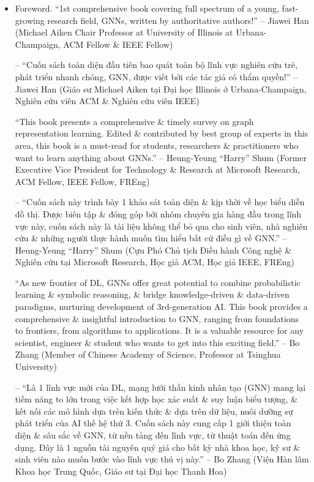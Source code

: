 \documentclass{article}
\begin{document}
\begin{itemize}
    \item {\sf Foreword.} ``1st comprehensive book covering full spectrum of a young, fast-growing research field, GNNs, written by authoritative authors!'' -- Jiawei Han (Michael Aiken Chair Professor at University of Illinois at Urbana-Champaign, ACM Fellow \& IEEE Fellow)

    -- ``Cuốn sách toàn diện đầu tiên bao quát toàn bộ lĩnh vực nghiên cứu trẻ, phát triển nhanh chóng, GNN, được viết bởi các tác giả có thẩm quyền!'' -- Jiawei Han (Giáo sư Michael Aiken tại Đại học Illinois ở Urbana-Champaign, Nghiên cứu viên ACM \& Nghiên cứu viên IEEE)

    ``This book presents a comprehensive \& timely survey on graph representation learning. Edited \& contributed by best group of experts in this area, this book is a must-read for students, researchers \& practitioners who want to learn anything about GNNs.'' -- Heung-Yeung ``Harry'' Shum (Former Executive Vice President for Technology \& Research at Microsoft Research, ACM Fellow, IEEE Fellow, FREng)

    -- ``Cuốn sách này trình bày 1 khảo sát toàn diện \& kịp thời về học biểu diễn đồ thị. Được biên tập \& đóng góp bởi nhóm chuyên gia hàng đầu trong lĩnh vực này, cuốn sách này là tài liệu không thể bỏ qua cho sinh viên, nhà nghiên cứu \& những người thực hành muốn tìm hiểu bất cứ điều gì về GNN.'' -- Heung-Yeung ``Harry'' Shum (Cựu Phó Chủ tịch Điều hành Công nghệ \& Nghiên cứu tại Microsoft Research, Học giả ACM, Học giả IEEE, FREng)

    ``As new frontier of DL, GNNs offer great potential to combine probabilistic learning \& symbolic reasoning, \& bridge knowledge-driven \& data-driven paradigms, nurturing development of 3rd-generation AI. This book provides a comprehensive \& insightful introduction to GNN, ranging from foundations to frontiers, from algorithms to applications. It is a valuable resource for any scientist, engineer \& student who wants to get into  this exciting field.'' -- Bo Zhang (Member of Chinese Academy of Science, Professor at Tsinghua University)

    -- ``Là 1 lĩnh vực mới của DL, mạng lưới thần kinh nhân tạo (GNN) mang lại tiềm năng to lớn trong việc kết hợp học xác suất \& suy luận biểu tượng, \& kết nối các mô hình dựa trên kiến thức \& dựa trên dữ liệu, nuôi dưỡng sự phát triển của AI thế hệ thứ 3. Cuốn sách này cung cấp 1 giới thiệu toàn diện \& sâu sắc về GNN, từ nền tảng đến lĩnh vực, từ thuật toán đến ứng dụng. Đây là 1 nguồn tài nguyên quý giá cho bất kỳ nhà khoa học, kỹ sư \& sinh viên nào muốn bước vào lĩnh vực thú vị này.'' -- Bo Zhang (Viện Hàn lâm Khoa học Trung Quốc, Giáo sư tại Đại học Thanh Hoa)


\end{itemize}
\end{document}
